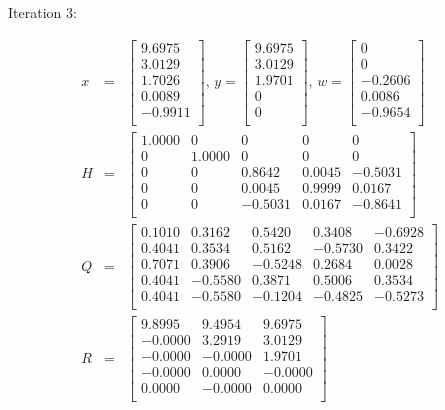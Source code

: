 Iteration 3:

\begin{eqnarray}
  x &=&
  \begin{bmatrix}
    9.6975 \\
    3.0129 \\
    1.7026 \\
    0.0089 \\
   -0.9911 \\
  \end{bmatrix}
  \text{, }
  y = 
  \begin{bmatrix}
    9.6975 \\
    3.0129 \\
    1.9701 \\
         0 \\
         0 \\
  \end{bmatrix}
  \text{, }
  w = 
  \begin{bmatrix}
         0 \\
         0 \\
   -0.2606 \\
    0.0086 \\
   -0.9654 \\
  \end{bmatrix}
  \\
  H &=& 
  \begin{bmatrix}
    1.0000 &        0 &        0 &        0 &        0 \\
         0 &   1.0000 &        0 &        0 &        0 \\
         0 &        0 &   0.8642 &   0.0045 &  -0.5031 \\
         0 &        0 &   0.0045 &   0.9999 &   0.0167 \\
         0 &        0 &  -0.5031 &   0.0167 &  -0.8641 \\
  \end{bmatrix}
  \\
  Q &=&
  \begin{bmatrix}
    0.1010 &   0.3162 &   0.5420 &   0.3408 &  -0.6928 \\
    0.4041 &   0.3534 &   0.5162 &  -0.5730 &   0.3422 \\
    0.7071 &   0.3906 &  -0.5248 &   0.2684 &   0.0028 \\
    0.4041 &  -0.5580 &   0.3871 &   0.5006 &   0.3534 \\
    0.4041 &  -0.5580 &  -0.1204 &  -0.4825 &  -0.5273 \\
  \end{bmatrix}
  \\
  R &=& 
  \begin{bmatrix}
    9.8995 &   9.4954 &   9.6975 \\
   -0.0000 &   3.2919 &   3.0129 \\
   -0.0000 &  -0.0000 &   1.9701 \\
   -0.0000 &   0.0000 &  -0.0000 \\
    0.0000 &  -0.0000 &   0.0000 \\
  \end{bmatrix}
\end{eqnarray}

